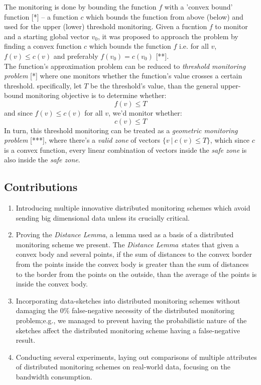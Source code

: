 \documentclass[10pt, conference]{IEEEtran}
\newcommand{\distanceLemma}{\textit{Distance Lemma}}
\begin{document}
The monitoring is done by bounding the function $f$ with a 'convex bound' function [*] -- a function $c$ which bounds the function from above (below) and used for the upper (lower) threshold monitoring.
Given a fucntion $f$ to monitor and a starting global vector $v_0$, it was proposed to approach the problem by finding a convex function $c$ which bounds the function $f$ i.e. for all $v$, ${f(v) \leq c(v)}$ and preferably ${f(v_0)=c(v_0)}$ [**]. \\
The function's approximation problem can be reduced to \textit{threshold monitoring problem} [*] where one monitors whether the function's value crosses a certain threshold. specifically, let $T$ be the threshold's value, than the general upper-bound monitoring objective is to determine whether:
\begin{equation}
\label{functionMonitoringConstraint}
f(v) \leq T
\end{equation}
and since ${f(v) \leq c(v)}$ for all $v$, we'd monitor whether:
\begin{equation}
\label{monitoringConstraint}
c(v) \leq T
\end{equation}
In turn, this threshold monitoring can be treated as a \textit{geometric monitoring problem} [***], where there's a \textit{valid zone} of vectors ${\{v \ | \ c(v) \leq T\}}$, which since $c$ is a convex function, every linear combination of vectors inside the \textit{safe zone} is also inside the \textit{safe zone}. 
\subsection{Contributions}
\begin{enumerate}
\item Introducing multiple innovative distributed monitoring schemes which avoid sending big dimensional data unless its crucially critical.
\item Proving the \distanceLemma , a lemma used as a basis of a distributed monitoring scheme we present. The \distanceLemma \ states that given a convex body and several points, if the sum of distances to the convex border from the points inside the convex body is greater than the sum of distances to the border from the points on the outside, than the average of the points is inside the convex body.
\item Incorporating data-sketches into distributed monitoring schemes without damaging the 0\% false-negative necessity of the distributed monitoring problem;e.g., we managed to prevent having the probabilistic nature of the sketches affect the distributed monitoring scheme having a false-negative result.
\item Conducting several experiments, laying out comparisons of multiple attributes of distributed monitoring schemes on real-world data, focusing on the bandwidth consumption.
\end{enumerate}
\end{document}
